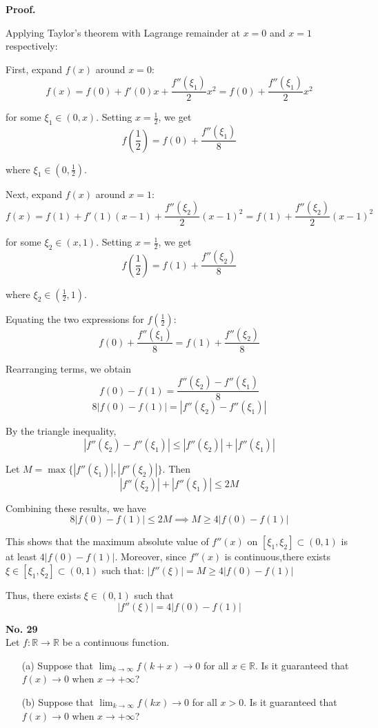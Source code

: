 \documentclass[a4paper, 11pt]{article}
\newenvironment{problem}[2][No.]
    { \begin{mdframed}[backgroundcolor=gray!5] \textbf{#1 #2} \\}
    {  \end{mdframed}}
\newenvironment{solution}
    {\textbf{Proof.}}
    {}
\begin{document}
\begin{solution}

	Applying Taylor's theorem with Lagrange remainder at \( x = 0 \) and \( x = 1 \) respectively:
	
	First, expand \( f(x) \) around \( x = 0 \):
$$
	f(x) = f(0) + f'(0)x + \frac{f''(\xi_1)}{2}x^2 = f(0) + \frac{f''(\xi_1)}{2}x^2
$$

	for some \( \xi_1 \in (0, x) \). Setting \( x = \frac{1}{2} \), we get
$$
	f\left(\frac{1}{2}\right) = f(0) + \frac{f''(\xi_1)}{8}
$$

	where \( \xi_1 \in \left(0, \frac{1}{2}\right) \).
	
	Next, expand \( f(x) \) around \( x = 1 \):
$$
	f(x) = f(1) + f'(1)(x - 1) + \frac{f''(\xi_2)}{2}(x - 1)^2 = f(1) + \frac{f''(\xi_2)}{2}(x - 1)^2
$$
	
	for some \( \xi_2 \in (x, 1) \). Setting \( x = \frac{1}{2} \), we get
$$
	f\left(\frac{1}{2}\right) = f(1) + \frac{f''(\xi_2)}{8}
$$

	where \( \xi_2 \in \left(\frac{1}{2}, 1\right) \).
	
	Equating the two expressions for \( f\left(\frac{1}{2}\right) \):
$$
	f(0) + \frac{f''(\xi_1)}{8} = f(1) + \frac{f''(\xi_2)}{8}
$$

	Rearranging terms, we obtain
$$
	f(0) - f(1) = \frac{f''(\xi_2) - f''(\xi_1)}{8}
$$
$$
	8|f(0) - f(1)| = |f''(\xi_2) - f''(\xi_1)|
$$
	
	By the triangle inequality,
$$
	|f''(\xi_2) - f''(\xi_1)| \leq |f''(\xi_2)| + |f''(\xi_1)|
$$
	
	Let \( M = \max\{|f''(\xi_1)|, |f''(\xi_2)|\} \). Then
$$
	|f''(\xi_2)| + |f''(\xi_1)| \leq 2M
$$

	Combining these results, we have
$$
	8|f(0) - f(1)| \leq 2M \implies M \geq 4|f(0) - f(1)|
$$
	
This shows that the maximum absolute value of \( f''(x) \) on \( [\xi_1, \xi_2] \subset (0, 1) \) is at least \( 4|f(0) - f(1)| \). Moreover, since \( f''(x) \) is continuous,there exists \( \xi \in [\xi_1, \xi_2] \subset (0, 1) \) such that: \( |f''(\xi)| = M \geq 4|f(0) - f(1)| \)
	
	Thus, there exists \( \xi \in (0,1) \) such that
$$
	|f''(\xi)| = 4|f(0) - f(1)|
$$
\end{solution}
\begin{problem}{29}
	Let \( f : \mathbb{R} \to \mathbb{R} \) be a continuous function.
	\begin{enumerate}
		\item[(a)] Suppose that \( \lim_{k \to \infty} f(k + x) \to 0 \) for all \( x \in \mathbb{R} \). Is it guaranteed that \( f(x) \to 0 \) when \( x \to +\infty \)?
		
		\item[(b)] Suppose that \( \lim_{k \to \infty} f(kx) \to 0 \) for all \( x > 0 \). Is it guaranteed that \( f(x) \to 0 \) when \( x \to +\infty \)?
	\end{enumerate}
\end{problem}
\end{document}
